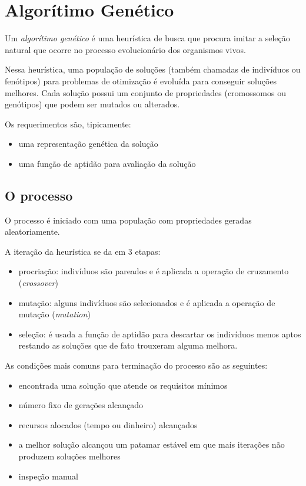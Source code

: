 \section{Algorítimo Genético}

Um \emph{algorítimo genético} é uma heurística de busca que procura
imitar a seleção natural que ocorre no processo evolucionário dos
organismos vivos.

Nessa heurística, uma população de soluções (também chamadas de
indivíduos ou fenótipos) para problemas de otimização é evoluída para
conseguir soluções melhores. Cada solução possui um conjunto de
propriedades (cromossomos ou genótipos) que podem ser mutados ou
alterados.

Os requerimentos são, tipicamente:

\begin{itemize}
\item
  uma representação genética da solução
\item
  uma função de aptidão para avaliação da solução
\end{itemize}

\subsection{O processo}

O processo é iniciado com uma população com propriedades geradas
aleatoriamente.

A iteração da heurística se da em 3 etapas:

\begin{itemize}
\item
  procriação: indivíduos são pareados e é aplicada a operação de
  cruzamento (\emph{crossover})
\item
  mutação: alguns indivíduos são selecionados e é aplicada a operação de
  mutação (\emph{mutation})
\item
  seleção: é usada a função de aptidão para descartar os indivíduos
  menos aptos restando as soluções que de fato trouxeram alguma melhora.
\end{itemize}

As condições mais comuns para terminação do processo são as seguintes:

\begin{itemize}
\item
  encontrada uma solução que atende os requisitos mínimos
\item
  número fixo de gerações alcançado
\item
  recursos alocados (tempo ou dinheiro) alcançados
\item
  a melhor solução alcançou um patamar estável em que mais iterações não
  produzem soluções melhores
\item
  inspeção manual
\end{itemize}

